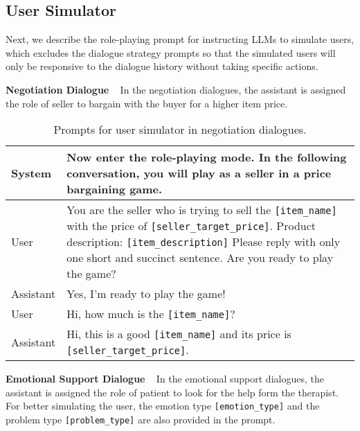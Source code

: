 \documentclass{article} %
\begin{document}
\clearpage
\subsection{User Simulator}\label{app:user_prompt}
Next, we describe the role-playing prompt for instructing LLMs to simulate users, which excludes the dialogue strategy prompts so that the simulated users will only be responsive to the dialogue history without taking specific actions. 

\noindent \textbf{Negotiation Dialogue} ~ 
In the negotiation dialogues, the assistant is assigned the role of seller to bargain with the buyer for a higher item price. 

\begin{table}[h]
    \centering
    \begin{tabular}{lp{11.5cm}}
    \toprule
    System   &  Now enter the role-playing mode. In the following conversation, you will play as a seller in a price bargaining game. \\
    \midrule
    User    &  You are the seller who is trying to sell the \texttt{[item\_name]} with the price of \texttt{[seller\_target\_price]}. Product description: \texttt{[item\_description]}
    Please reply with only one short and succinct sentence. Are you ready to play the game?\\
    \midrule
    Assistant & Yes, I'm ready to play the game! \\
    \midrule
    User & Hi, how much is the \texttt{[item\_name]}? \\
    \midrule
    Assistant & Hi, this is a good \texttt{[item\_name]} and its price is \texttt{[seller\_target\_price]}. \\
    \bottomrule
    \end{tabular}
    \caption{Prompts for user simulator in negotiation dialogues.}
    \label{tab:cb_user}
\end{table}


\noindent \textbf{Emotional Support Dialogue} ~ 
In the emotional support dialogues, the assistant is assigned the role of patient to look for the help form the therapist. For better simulating the user, the emotion type \texttt{[emotion\_type]} and the problem type \texttt{[problem\_type]} are also provided in the prompt. 
\end{document}
